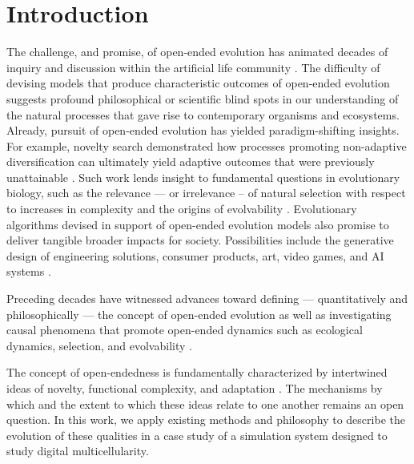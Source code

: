 \section{Introduction}

The challenge, and promise, of open-ended evolution has animated decades of inquiry and discussion within the artificial life community \citep{packard2019overview}.
The difficulty of devising models that produce characteristic outcomes of open-ended evolution suggests profound philosophical or scientific blind spots in our understanding of the natural processes that gave rise to contemporary organisms and ecosystems.
Already, pursuit of open-ended evolution has yielded paradigm-shifting insights.
For example, novelty search demonstrated how processes promoting non-adaptive diversification can ultimately yield adaptive outcomes that were previously unattainable \citep{lehman2011abandoning}. 
Such work lends insight to fundamental questions in evolutionary biology, such as the relevance — or irrelevance – of natural selection with respect to increases in complexity \citep{lehman2012evolution, Lynch8597} and the origins of evolvability \citep{lehman2013evolvability,Kirschner8420}. Evolutionary algorithms devised in support of open-ended evolution models also promise to deliver tangible broader impacts for society. Possibilities include the generative design of engineering solutions, consumer products, art, video games, and AI systems \citep{nguyen2015,stanley2017open}.

Preceding decades have witnessed advances toward defining — quantitatively and philosophically — the concept of open-ended evolution \citep{lehman2012beyond,dolson2019modes,bedau1998classification} as well as investigating causal phenomena that promote open-ended dynamics such as ecological dynamics, selection, and evolvability \citep{dolson2019constructive,soros2014identifying,huizinga2018emergence}.

The concept of open-endedness is fundamentally characterized by intertwined ideas of novelty, functional complexity, and adaptation \citep{taylor2016open}.
The mechanisms by which and the extent to which these ideas relate to one another remains an open question.
In this work, we apply existing methods and philosophy to describe the evolution of these qualities in a case study of a simulation system designed to study digital multicellularity.